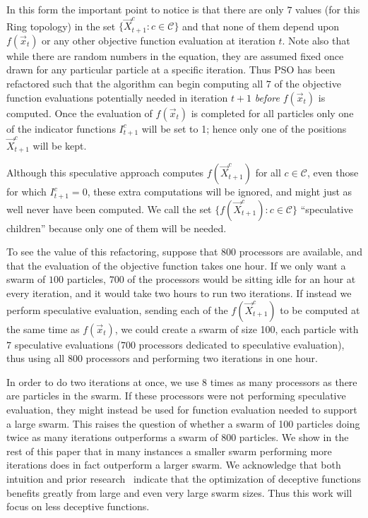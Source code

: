 \documentclass{llncs}
\providecommand{\ppos}{\ensuremath{\Vec{x}}}
\providecommand{\ofunc}{\ensuremath{f}}
\providecommand{\indic}{\ensuremath{I}}
\providecommand{\specpos}{\ensuremath{\vec{X}}}
\providecommand{\caseset}{\ensuremath{\mathcal{C}}}
\providecommand{\casegen}{\ensuremath{c}}
\begin{document}
In this form the important point to notice is that there are only $7$ values
(for this Ring topology) in the set $\{\specpos_{t+1}^{\casegen}: \casegen \in
\caseset\}$ and that none of them depend upon $f(\ppos_t)$ or any other
objective function evaluation at iteration $t$. Note also that while there are
random numbers in the equation, they are assumed fixed once drawn for any
particular particle at a specific iteration.  Thus PSO has been refactored such
that the algorithm can begin computing all $7$ of the objective function
evaluations potentially needed in iteration $t+1$ \emph{before} $f(\ppos_t)$ is
computed.  Once the evaluation of $f(\ppos_{t})$ is completed for all particles
only one of the indicator functions $\indic_{t+1}^{\casegen}$ will be set to 1;
hence only one of the positions $\specpos_{t+1}^\casegen$ will be kept.

Although this speculative approach computes $\ofunc(\specpos_{t+1}^{\casegen})$
for all $\casegen \in \caseset$, even those for which $\indic_{t+1}^{\casegen}
= 0$, these extra computations will be ignored, and might just as well never
have been computed.  We call the set $\{\ofunc(\specpos_{t+1}^{c}) : \casegen
\in \caseset\}$ ``speculative children'' because only one of them will be
needed.

To see the value of this refactoring, suppose that $800$ processors are
available, and that the evaluation of the objective function takes one hour.
If we only want a swarm of $100$ particles, $700$ of the processors would be
sitting idle for an hour at every iteration, and it would take two hours to run
two iterations.  If instead we perform speculative evaluation, sending each of
the $\ofunc(\specpos_{t+1}^{c})$ to be computed at the same time as
$\ofunc(\ppos_{t})$, we could create a swarm of size 100, each particle with
$7$ speculative evaluations ($700$ processors dedicated to speculative
evaluation), thus using all $800$ processors and performing two iterations in
one hour.

In order to do two iterations at once, we use 8 times as many processors as
there are particles in the swarm.  If these processors were not performing
speculative evaluation, they might instead be used for function evaluation
needed to support a large swarm.  This raises the question of whether a swarm
of 100 particles doing twice as many iterations outperforms a swarm of 800
particles.  We show in the rest of this paper that in many instances a smaller
swarm performing more iterations does in fact outperform a larger swarm.  We
acknowledge that both intuition and prior
research~\cite{mcnabb-2009-large-particle-swarms} indicate that the
optimization of deceptive functions benefits greatly from large and even very
large swarm sizes. Thus this work will focus on less deceptive functions.
\end{document}
